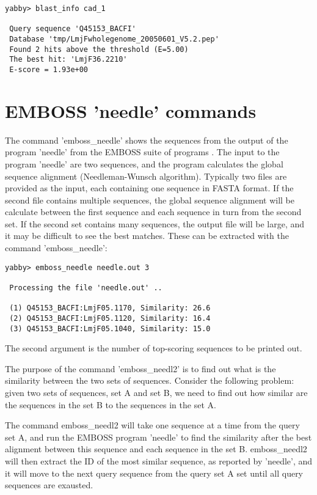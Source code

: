 \begin{verbatim}
yabby> blast_info cad_1

 Query sequence 'Q45153_BACFI'
 Database 'tmp/LmjFwholegenome_20050601_V5.2.pep'
 Found 2 hits above the threshold (E=5.00)
 The best hit: 'LmjF36.2210'
 E-score = 1.93e+00
\end{verbatim}

\section{EMBOSS 'needle' commands}


The command 'emboss\_needle' shows the sequences from the output
of the program 'needle' from the EMBOSS suite of programs
\cite{emboss}. The input to the program 'needle' are two
sequences, and the program calculates the global sequence
alignment (Needleman-Wunsch algorithm). Typically two files
are provided as the input, each containing one sequence in FASTA  
format. If the second file contains multiple sequences,
the global sequence alignment will be calculate between
the first sequence and each sequence in turn from the
second set. If the second set contains many sequences, the
output file will be large, and it may be difficult to see
the best matches. These can be extracted with the command
'emboss\_needle':

\begin{verbatim}
yabby> emboss_needle needle.out 3

 Processing the file 'needle.out' ..

 (1) Q45153_BACFI:LmjF05.1170, Similarity: 26.6
 (2) Q45153_BACFI:LmjF05.1120, Similarity: 16.4
 (3) Q45153_BACFI:LmjF05.1040, Similarity: 15.0
\end{verbatim}

The second argument is the number of top-scoring sequences
to be printed out.


The purpose of the command 'emboss\_needl2' is to find out
what is the similarity between the two sets of sequences.
Consider the following problem: given two sets of sequences,
set A and set B, we need to find out how similar are the
sequences in the set B to the sequences in the set A.

The command emboss\_needl2 will take one sequence at a time
from the query set A, and run the EMBOSS program 'needle' to
find the similarity after the best alignment between this
sequence and each sequence in the set B. emboss\_needl2 will
then extract the ID of the most similar sequence, as reported
by 'needle', and it will move to the next query sequence from
the query set A set until all query sequences are exausted.

